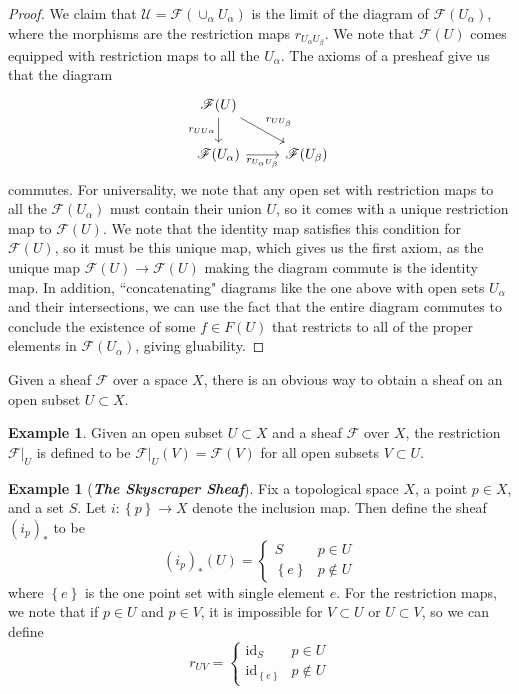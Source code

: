 \documentclass[psamsfonts]{amsart}
\theoremstyle{definition}
\newtheorem{exmp}[thm]{Example}
\theoremstyle{remark}
\newcommand{\ib}[1]{\textbf{\textit{#1}}}
\newcommand{\set}[1]{\left\lbrace #1 \right\rbrace}
\DeclareMathOperator{\id}{id}
\begin{document}
\begin{proof}
We claim that $\mathscr{U} = \mathscr{F}(\cup_\alpha U_\alpha)$ is the limit of the diagram of $\mathscr{F}(U_\alpha)$, where the morphisms are the restriction maps $r_{U_\alpha U_\beta}$. We note that $\mathscr{F}(U)$ comes equipped with restriction maps to all the $U_\alpha$. The axioms of a presheaf give us that the diagram
$$\begin{tikzcd}
\mathscr{F}(U) \ar[d, "r_{UU\alpha}"'] \ar[dr, "r_{UU_\beta}"] \\
\mathscr{F}(U_\alpha) \ar[r, "r_{U_\alpha U_\beta}"'] & \mathscr{F}(U_\beta)
\end{tikzcd}$$
commutes. For universality, we note that any open set with restriction maps to all the $\mathscr{F}(U_\alpha)$ must contain their union $U$, so it comes with a unique restriction map to $\mathscr{F}(U)$. We note that the identity map satisfies this condition for $\mathscr{F}(U)$, so it must be this unique map, which gives us the first axiom, as the unique map $\mathscr{F}(U) \to \mathscr{F}(U)$ making the diagram commute is the identity map. In addition, ``concatenating" diagrams like the one above with open sets $U_\alpha$ and their intersections, we can use the fact that the entire diagram commutes to conclude the existence of some $f \in F(U)$ that restricts to all of the proper elements in $\mathscr{F}(U_\alpha)$, giving gluability.
\end{proof}
Given a sheaf $\mathscr{F}$ over a space $X$, there is an obvious way to obtain a sheaf on an open subset $U \subset X$.
\begin{exmp}
Given an open subset $U \subset X$ and a sheaf $\mathscr{F}$ over $X$, the restriction $\mathscr{F}\big\vert_U$ is defined to be $\mathscr{F}\big\vert_U(V) = \mathscr{F}(V)$ for all open subsets $V \subset U$.
\end{exmp}
\begin{exmp}[\ib{The Skyscraper Sheaf}]
Fix a topological space $X$, a point $p \in X$, and a set $S$. Let $i : \set{p} \to X$ denote the inclusion map. Then define the sheaf $(i_p)_*$ to be 
$$(i_p)_*(U) = \begin{cases}
S & p \in U \\
\set{e} & p \notin U
\end{cases}$$
where $\set{e}$ is the one point set with single element $e$. For the restriction maps, we note that if $p \in U$ and $p \in V$, it is impossible for $V \subset U$ or $U \subset V$, so we can define 
$$r_{UV} = \begin{cases} 
\id_S & p \in U \\
\id_{\set{e}} & p \notin U
\end{cases}$$
\end{exmp}
\end{document}
